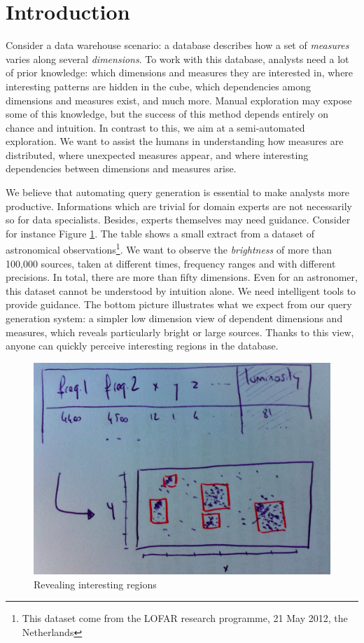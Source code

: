 \section{Introduction}
\label{sec:intro}

Consider a data warehouse scenario: a database describes how a set of
\emph{measures} varies along several \emph{dimensions}. To work with this
database, analysts need a lot of prior knowledge: which dimensions and measures
they are interested in, where interesting patterns are hidden in the cube,
which dependencies among dimensions and measures exist, and much more.  Manual
exploration may expose some of this knowledge, but the success of this method
depends entirely on chance and intuition. In contrast to this, we aim at a
semi-automated exploration.  We want to assist the humans in understanding how
measures are distributed, where unexpected measures appear, and where
interesting dependencies between dimensions and measures arise.

We believe that automating query generation is essential to make analysts
more productive. Informations which are trivial for domain experts are not
necessarily so for data specialists. Besides, experts themselves may need
guidance. Consider for instance Figure \ref{intro}. The table shows a small
extract from a dataset of astronomical observations\footnote{This dataset come
from the LOFAR research programme, 21 May 2012, the Netherlands}. We want
to observe the \emph{brightness} of more than 100,000 sources, taken at
different times, frequency ranges and with different precisions. In total,
there are more than fifty dimensions. Even for an astronomer, this dataset
cannot be understood by intuition alone. We need intelligent tools to provide
guidance.  The bottom picture illustrates what we expect from our query
generation system: a simpler low dimension view of dependent dimensions and
measures, which reveals particularly bright or large sources. Thanks to this
view, anyone can quickly perceive interesting regions in the database.

\begin{figure}[t!]
\centering
\includegraphics[width=0.8\columnwidth]{images/intro}
\caption{Revealing interesting regions}
\label{intro}
\end{figure}

